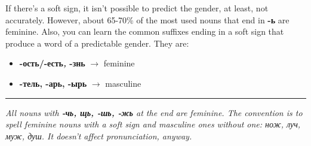 If there's a soft sign, it isn't possible to predict the gender, at
least, not accurately. However, about 65-70\% of the most used nouns
that end in \textbf{-ь} are feminine. Also, you can learn the common
suffixes ending in a soft sign that produce a word of a predictable
gender. They are:

\begin{itemize}
\tightlist
\item
  \textbf{-ость/-есть\emph{,} -знь} $ \rightarrow$ feminine
\item
  \textbf{-тель, -арь, -ырь} $ \rightarrow$ masculine
\end{itemize}

\begin{center}\rule{0.5\linewidth}{\linethickness}\end{center}

\emph{All nouns with \textbf{-чь, щь, -шь, -жь} at the end are feminine.
The convention is to spell feminine nouns with a soft sign and masculine
ones without one: нож, луч, муж, душ. It doesn't affect pronunciation,
anyway.}
